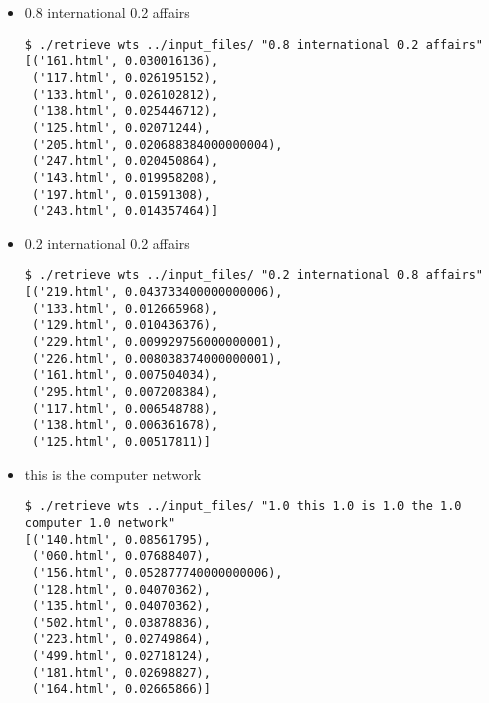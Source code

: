\documentclass[paper=a4, fontsize=11pt]{scrartcl}
\numberwithin{equation}{section}		%
\numberwithin{figure}{section}			%
\numberwithin{table}{section}				%
\begin{document}
\begin{itemize}
\begin{verbatim}
\end{verbatim}

\item 0.8 international 0.2 affairs

\begin{verbatim}
$ ./retrieve wts ../input_files/ "0.8 international 0.2 affairs"
[('161.html', 0.030016136),
 ('117.html', 0.026195152),
 ('133.html', 0.026102812),
 ('138.html', 0.025446712),
 ('125.html', 0.02071244),
 ('205.html', 0.020688384000000004),
 ('247.html', 0.020450864),
 ('143.html', 0.019958208),
 ('197.html', 0.01591308),
 ('243.html', 0.014357464)]

\end{verbatim}

\item 0.2 international 0.2 affairs

\begin{verbatim}
$ ./retrieve wts ../input_files/ "0.2 international 0.8 affairs"
[('219.html', 0.043733400000000006),
 ('133.html', 0.012665968),
 ('129.html', 0.010436376),
 ('229.html', 0.009929756000000001),
 ('226.html', 0.008038374000000001),
 ('161.html', 0.007504034),
 ('295.html', 0.007208384),
 ('117.html', 0.006548788),
 ('138.html', 0.006361678),
 ('125.html', 0.00517811)]
\end{verbatim}

\item this is the computer network

\begin{verbatim}
$ ./retrieve wts ../input_files/ "1.0 this 1.0 is 1.0 the 1.0 computer 1.0 network"
[('140.html', 0.08561795),
 ('060.html', 0.07688407),
 ('156.html', 0.052877740000000006),
 ('128.html', 0.04070362),
 ('135.html', 0.04070362),
 ('502.html', 0.03878836),
 ('223.html', 0.02749864),
 ('499.html', 0.02718124),
 ('181.html', 0.02698827),
 ('164.html', 0.02665866)]
\end{verbatim}

\end{itemize}


\end{document}
